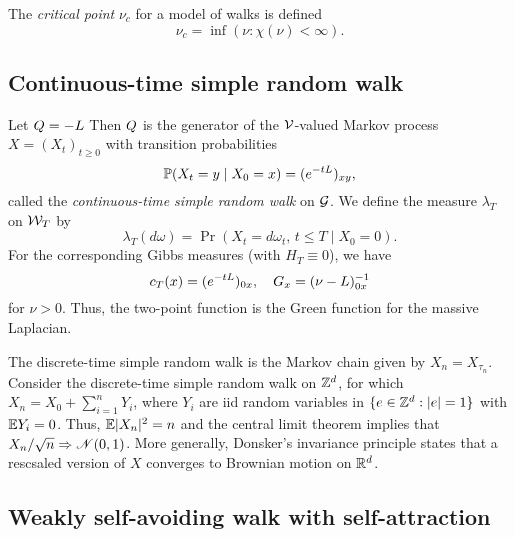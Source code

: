 The \emph{critical point} $\nu_c$ for a model of walks is defined
\begin{equation}
\nu_c = \inf (\nu : \chi(\nu) < \infty).
\end{equation}


\subsection{Continuous-time simple random walk}

Let $Q = -L$
Then $Q$ is the generator of the $\mathcal{V}$-valued Markov process
$X = (X_t)_{t \ge 0}$ with transition probabilities
\begin{equation}
\operatorname{\mathbb{P}}(X_t = y \mid X_0 = x) = (e^{-t L})_{xy},
\end{equation}
called the \emph{continuous-time simple random walk} on $\mathcal{G}$.
We define the measure $\lambda_T$ on $\mathcal{W}_T$ by
\begin{equation}
\lambda_T(d\omega) = \Pr(X_t = d\omega_t, \, t \le T \mid X_0 = 0).
\end{equation}
For the corresponding Gibbs measures (with $H_T \equiv 0$), we have
\begin{equation}
c_T(x) = (e^{-t L})_{0x},
  \quad
G_x = (\nu - L)^{-1}_{0x}
\end{equation}
for $\nu > 0$. Thus, the two-point function is the Green function for the
massive Laplacian.

\begin{example}
The discrete-time simple random walk is the Markov chain given by
$X_n = X_{\tau_n}$. Consider the discrete-time simple random walk on ${ {{\mathbb Z}}^d }$,
for which $X_n = X_0 + \sum_{i=1}^n Y_i$, where $Y_i$ are iid random variables
in $\{ e \in { {{\mathbb Z}}^d } : |e| = 1 \}$ with $\mathbb{E} Y_i = 0$. Thus, $\mathbb{E} |X_n|^2 = n$ and
the central limit theorem implies that
$X_n / \sqrt n \Rightarrow \mathscr{N}(0, 1)$. More generally, Donsker's invariance
principle states that a rescsaled version of $X$ converges to Brownian motion on ${ {{\mathbb R}}^d}$.
\end{example}


\subsection{Weakly self-avoiding walk with self-attraction}

